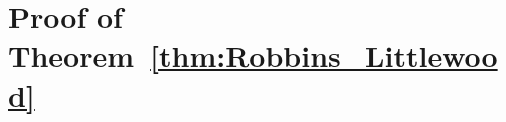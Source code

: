 \setcounter{section}{3}
\section{Proof of Theorem~\ref{thm:Robbins_Littlewood}}
\label{sec:mainproof}
\setcounter{equation}{5}
